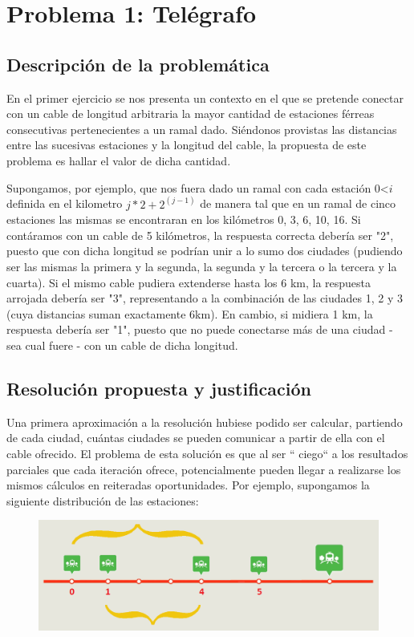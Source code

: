 \section{Problema 1: Tel\'egrafo}

\subsection{Descripci\'on de la problem\'atica}

En el primer ejercicio se nos presenta un contexto en el que se pretende conectar con un cable de longitud arbitraria la mayor cantidad de estaciones férreas consecutivas pertenecientes a un ramal dado. 
Siéndonos provistas las distancias entre las sucesivas estaciones y la longitud del cable, la propuesta de este problema es hallar el valor de dicha cantidad.

Supongamos, por ejemplo, que nos fuera dado un ramal con cada estación  0<$i$ definida en el kilometro $j*2+2^(j-1)$ de manera tal que en un ramal de cinco estaciones las mismas se encontraran en los kilómetros 0, 3, 6, 10, 16.
Si contáramos con un cable de 5 kilómetros, la respuesta correcta debería ser "2", puesto que con dicha longitud se podrían unir a lo sumo dos ciudades (pudiendo ser las mismas la primera y la segunda, la segunda y la tercera o la tercera y la cuarta).
Si el mismo cable pudiera extenderse hasta los 6 km, la respuesta arrojada debería ser "3", representando a la combinación de las ciudades 1, 2 y 3 (cuya distancias suman exactamente 6km).
En cambio, si midiera 1 km, la respuesta debería ser "1", puesto que no puede conectarse más de una ciudad - sea cual fuere - con un cable de dicha longitud.


\subsection{Resoluci\'on propuesta y justificaci\'on}
Una primera aproximación a la resolución hubiese podido ser calcular, partiendo de cada ciudad, cuántas ciudades se pueden comunicar a partir de ella con el cable ofrecido. El problema de esta solución es que al ser `` ciego`` a los resultados parciales que cada iteración ofrece, potencialmente pueden llegar a realizarse los mismos cálculos en reiteradas oportunidades.
Por ejemplo, supongamos la siguiente distribución de las estaciones:

  \begin{figure}[h!]
   \begin{center}
 	\includegraphics[scale=0.5]{imagenes/ej1/estaciones.png}
	\label{estaciones}
   \end{center}
 \end{figure}

